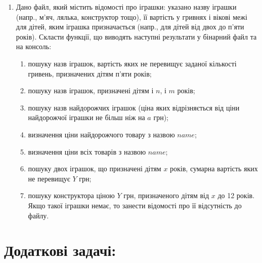 \documentclass[a5paper,titlepage,openany,twoside,draft]{book_unv}%
\makeatletter
\newcommand{\xslalph}[1]{\expandafter\@xslalph\csname c@#1\endcsname}
\newcommand{\@xslalph}[1]{%
    \ifcase#1\or а\or б\or в\or г\or д\or e\or є\or ж\or з\or i%
    \or й\or к\or л\or м\or н\or о\or п\or р\or с\or т%
    \or у\or ф\or х\or ц\or ч\or ш\or ю\or я\or аа\or бб\or вв%
    \else\@ctrerr\fi%
}
\makeatother
\begin{document}
\begin{enumerate}
\item
  Дано файл, який містить відомості про іграшки: указано назву іграшки
  (напр., м'яч, лялька, конструктор тощо), її вартість у гривнях і
  вікові межі для дітей, яким іграшка призначається (напр., для дітей
  від двох до п'яти років). Скласти функції, що виводять наступні результати 
  у бінарний файл та на консоль:

  \begin{enumerate}[label=\xslalph*)]
\item
пошуку назв іграшок, вартість яких не перевищує заданої кількості гривень,
 призначених дітям п'яти років;
\item
пошуку назв іграшок, призначені дітям і $n$, і $m$ років;
\item
пошуку назв найдорожчих іграшок (ціна яких відрізняється від ціни
найдорожчої іграшки не більш ніж на $a$ грн);
\item визначення ціни найдорожчого товару з назвою $name$;
\item визначення ціни всіх товарів з назвою $name$;
\item пошуку двох іграшок, що призначені дітям $x$ років, сумарна
вартість яких не перевищує $Y$ грн;
\item
пошуку конструктора ціною $Y$ грн, призначеного дітям від $x$ до
12 років. Якщо такої іграшки немає, то занести відомості про її
відсутність до файлу.
  \end{enumerate} 


\end{enumerate}

\section{Додаткові задачі:}
\end{document}
